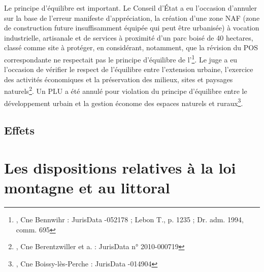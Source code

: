 			Le principe d'équilibre est important. Le Conseil d'État a eu l'occasion d'annuler sur la base de l'erreur manifeste d'appréciation, la création d'une zone NAF (zone de construction future insuffisamment équipée qui peut être urbanisée) à vocation industrielle, artisanale et de services à proximité d'un parc boisé de 40 hectares, classé comme site à protéger, en considérant, notamment, que la révision du POS correspondante ne respectait pas le principe d'équilibre de l'\footnote{, Cne Bennwihr : JurisData -052178 ; Lebon T., p. 1235 ; Dr. adm. 1994, comm. 695}. Le juge a eu l'occasion de vérifier le respect de l'équilibre entre l'extension urbaine, l'exercice des activités économiques et la préservation des milieux, sites et paysages naturels\footnote{, Cne Berentzwiller et a. : JurisData n° 2010-000719}. Un PLU a été annulé pour violation du principe d'équilibre entre le développement urbain et la gestion économe des espaces naturels et ruraux\footnote{, Cne Boissy-lès-Perche : JurisData -014904}.

	\subsection{Effets}

\section{Les dispositions relatives à la loi montagne et au littoral}


